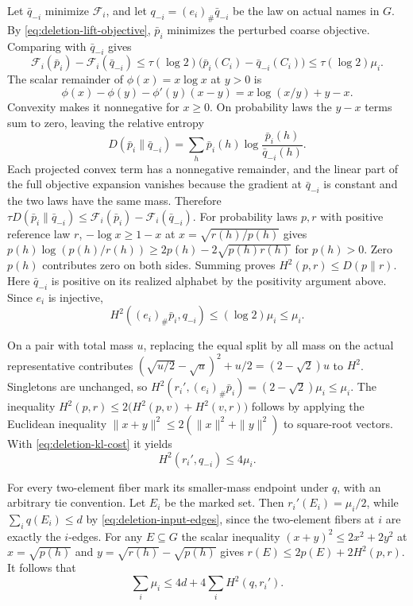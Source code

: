 \documentclass[11pt]{article}
\theoremstyle{definition}\newtheorem{definition}[theorem]{Definition}
\begin{document}
Let $\bar q_{-i}$ minimize $\mathcal F_i$, and let
$q_{-i}=(e_i)_\#\bar q_{-i}$ be the law on actual names in $G$. By
\eqref{eq:deletion-lift-objective}, $\bar p_i$ minimizes the perturbed coarse
objective. Comparing with $\bar q_{-i}$ gives
\begin{equation}
  \mathcal F_i(\bar p_i)-\mathcal F_i(\bar q_{-i})
      \le\tau(\log2)\bigl(\bar p_i(C_i)-\bar q_{-i}(C_i)\bigr)
      \le\tau(\log2)\mu_i.
  \label{eq:deletion-collapse-gap}
\end{equation}
The scalar remainder of $\phi(x)=x\log x$ at $y>0$ is
\[
  \phi(x)-\phi(y)-\phi'(y)(x-y)=x\log(x/y)+y-x.
\]
Convexity makes it nonnegative for $x\ge0$. On probability laws the $y-x$
terms sum to zero, leaving the relative entropy
\[
  D(\bar p_i\|\bar q_{-i})
    =\sum_h\bar p_i(h)\log\frac{\bar p_i(h)}{\bar q_{-i}(h)}.
\]
Each projected convex term has a nonnegative remainder, and the linear part
of the full objective expansion vanishes because the gradient at
$\bar q_{-i}$ is constant and the two laws have the same mass. Therefore
$\tau D(\bar p_i\|\bar q_{-i})\le\mathcal F_i(\bar p_i)-\mathcal F_i(\bar q_{-i})$.
For probability laws $p,r$ with positive reference law $r$,
$-\log x\ge1-x$ at $x=\sqrt{r(h)/p(h)}$ gives
$p(h)\log(p(h)/r(h))\ge2p(h)-2\sqrt{p(h)r(h)}$ for $p(h)>0$.
Zero $p(h)$ contributes zero on both sides. Summing proves $H^2(p,r)\le D(p\|r)$.
Here $\bar q_{-i}$ is positive on its realized alphabet by the positivity
argument above. Since $e_i$ is injective,
\begin{equation}
  H^2((e_i)_\#\bar p_i,q_{-i})\le(\log2)\mu_i\le\mu_i.
  \label{eq:deletion-kl-cost}
\end{equation}

On a pair with total mass $u$, replacing the equal split by all mass on the
actual representative contributes
$(\sqrt{u/2}-\sqrt{u})^2+u/2=(2-\sqrt 2)u$ to $H^2$. Singletons are
unchanged, so $H^2(r_i',(e_i)_\#\bar p_i)=(2-\sqrt2)\mu_i\le\mu_i$.
The inequality $H^2(p,r)\le2\bigl(H^2(p,v)+H^2(v,r)\bigr)$ follows by
applying the Euclidean inequality $\|x+y\|^2\le2(\|x\|^2+\|y\|^2)$ to
square-root vectors. With \eqref{eq:deletion-kl-cost} it yields
\begin{equation}
  H^2(r_i',q_{-i})\le 4\mu_i.
  \label{eq:deletion-collapse-cost}
\end{equation}

For every two-element fiber mark its smaller-mass endpoint under $q$, with
an arbitrary tie convention. Let $E_i$ be the marked set. Then
$r_i'(E_i)=\mu_i/2$, while $\sum_i q(E_i)\le d$ by
\eqref{eq:deletion-input-edges}, since the two-element fibers at $i$ are
exactly the $i$-edges. For any $E\subseteq G$ the scalar inequality
$(x+y)^2\le2x^2+2y^2$ at $x=\sqrt{p(h)}$ and
$y=\sqrt{r(h)}-\sqrt{p(h)}$ gives $r(E)\le2p(E)+2H^2(p,r)$.
It follows that
\begin{equation}
  \sum_i\mu_i\le4d+4\sum_i H^2(q,r_i').
  \label{eq:deletion-marked-mass}
\end{equation}
\end{document}
